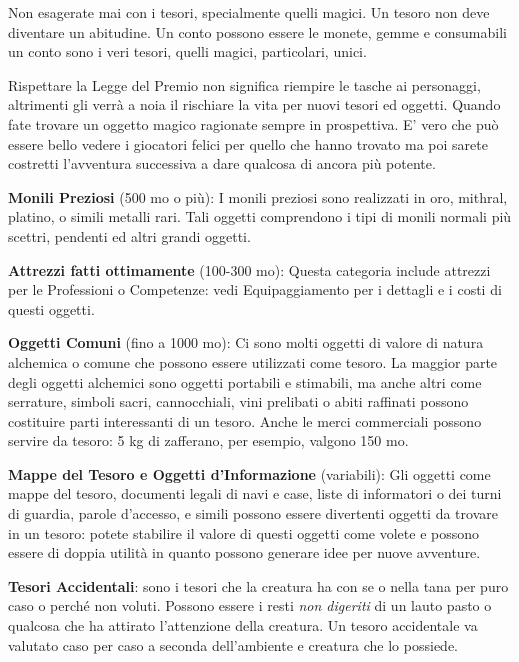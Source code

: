 \begin{multicols}{2}
\medskip

\begin{changemargin}{0.3cm}{0.3cm}\begin{narratore}
Non esagerate mai con i tesori, specialmente quelli magici. Un tesoro non deve diventare un abitudine. Un conto possono essere le monete, gemme e consumabili un conto sono i veri tesori, quelli magici, particolari, unici.

Rispettare la Legge del Premio non significa riempire le tasche ai personaggi, altrimenti gli verrà a noia il rischiare la vita per nuovi tesori ed oggetti. Quando fate trovare un oggetto magico ragionate sempre in prospettiva. E' vero che può essere bello vedere i giocatori felici per quello che hanno trovato ma poi sarete costretti l'avventura successiva a dare qualcosa di ancora più potente.
\end{narratore}\end{changemargin}

\medskip

\textbf{Monili Preziosi} (500 mo o più): I monili preziosi sono realizzati in oro, mithral, platino, o simili metalli rari. Tali oggetti comprendono i tipi di monili normali più scettri, pendenti ed altri grandi oggetti.

\textbf{Attrezzi fatti ottimamente} (100-300 mo): Questa categoria include attrezzi per le Professioni o Competenze: vedi Equipaggiamento per i dettagli e i costi di questi oggetti.

\textbf{Oggetti Comuni} (fino a 1000 mo): Ci sono molti oggetti di valore di natura alchemica o comune che possono essere utilizzati come tesoro. La maggior parte degli oggetti alchemici sono oggetti portabili e stimabili, ma anche altri come serrature, simboli sacri, cannocchiali, vini prelibati o abiti raffinati possono costituire parti interessanti di un tesoro. Anche le merci commerciali possono servire da tesoro: 5 kg di zafferano, per esempio, valgono 150 mo.

\textbf{Mappe del Tesoro e Oggetti d'Informazione} (variabili): Gli oggetti come mappe del tesoro, documenti legali di navi e case, liste di informatori o dei turni di guardia, parole d'accesso, e simili possono essere divertenti oggetti da trovare in un tesoro: potete stabilire il valore di questi oggetti come volete e possono essere di doppia utilità in quanto possono generare idee per nuove avventure.

\textbf{Tesori Accidentali}: sono i tesori che la creatura ha con se o nella tana per puro caso o perché non voluti. Possono essere i resti \emph{non digeriti} di un lauto pasto o qualcosa che ha attirato l'attenzione della creatura. Un tesoro accidentale  va valutato caso per caso a seconda dell'ambiente e creatura che lo possiede.



\end{multicols}
